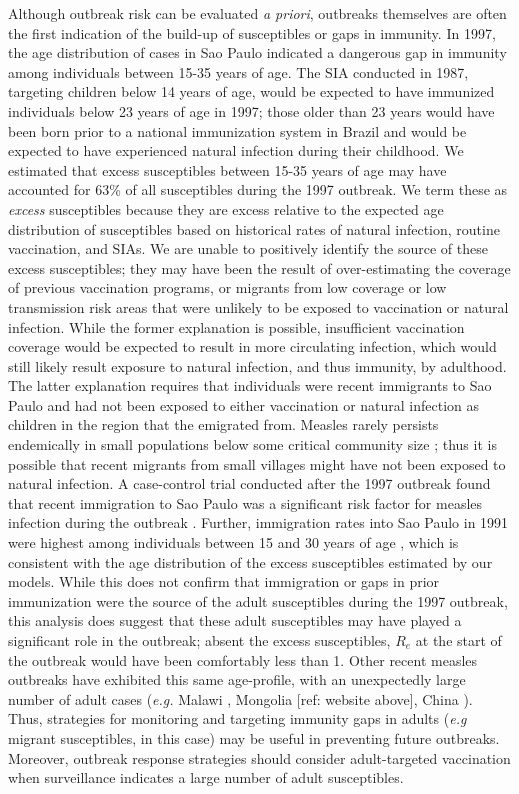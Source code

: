 Although outbreak risk can be evaluated \emph{a priori}, outbreaks themselves are often the first indication of the build-up of susceptibles or gaps in immunity. In 1997, the age distribution of cases in Sao Paulo indicated a dangerous gap in immunity among individuals between 15-35 years of age. The SIA conducted in 1987, targeting children below 14 years of age, would be expected to have immunized individuals below 23 years of age in 1997; those older than 23 years would have been born prior to a national immunization system in Brazil and would be expected to have experienced natural infection during their childhood. We estimated that excess susceptibles between 15-35 years of age may have accounted for 63\% of all susceptibles during the 1997 outbreak. We term these as \emph{excess} susceptibles because they are excess relative to the expected age distribution of susceptibles based on historical rates of natural infection, routine vaccination, and SIAs. We are unable to positively identify the source of these excess susceptibles; they may have been the result of over-estimating the coverage of previous vaccination programs, or migrants from low coverage or low transmission risk areas that were unlikely to be exposed to vaccination or natural infection. While the former explanation is possible, insufficient vaccination coverage would be expected to result in more circulating infection, which would still likely result exposure to natural infection, and thus immunity, by adulthood. The latter explanation requires that individuals were recent immigrants to Sao Paulo and had not been exposed to either vaccination or natural infection as children in the region that the emigrated from. Measles rarely persists endemically in small populations below some critical community size \cite{Conlan_2007, Keeling_1997}; thus it is possible that recent migrants from small villages might have not been exposed to natural infection.  A case-control trial conducted after the 1997 outbreak found that recent immigration to Sao Paulo was a significant risk factor for measles infection during the outbreak \citet{Camargo_2000} . Further, immigration rates into Sao Paulo in 1991 were highest among individuals between 15 and 30 years of age \cite{de_Moraes_2016}, which is consistent with the age distribution of the excess susceptibles estimated by our models. While this does not confirm that immigration or gaps in prior immunization were the source of the adult susceptibles during the 1997 outbreak, this analysis does suggest that these adult susceptibles may have played a significant role in the outbreak; absent the excess susceptibles, $R_e$ at the start of the outbreak would have been comfortably less than 1. Other recent measles outbreaks have exhibited this same age-profile, with an unexpectedly large number of adult cases (\emph{e.g.} Malawi \cite{Minetti_2013}, Mongolia [ref: website above], China \cite{Zheng_2015}). Thus, strategies for monitoring and targeting immunity gaps in adults (\emph{e.g} migrant susceptibles, in this case) may be useful in preventing future outbreaks. Moreover, outbreak response strategies should consider adult-targeted vaccination when surveillance indicates a large number of adult susceptibles.

